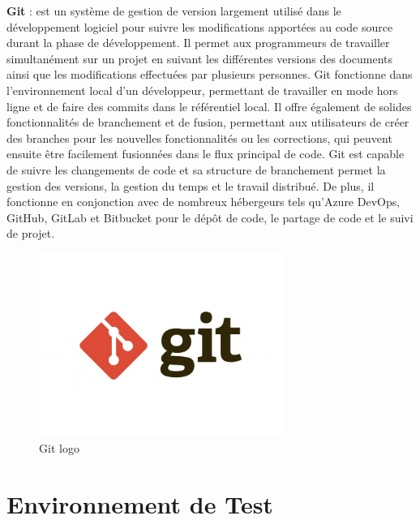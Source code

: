 \textbf{Git} : est un système de gestion de version largement utilisé dans le développement logiciel pour suivre les modifications apportées au code source durant la phase de développement. Il permet aux programmeurs de travailler simultanément sur un projet en suivant les différentes versions des documents ainsi que les modifications effectuées par plusieurs personnes. Git fonctionne dans l'environnement local d'un développeur, permettant de travailler en mode hors ligne et de faire des commits dans le référentiel local. Il offre également de solides fonctionnalités de branchement et de fusion, permettant aux utilisateurs de créer des branches pour les nouvelles fonctionnalités ou les corrections, qui peuvent ensuite être facilement fusionnées dans le flux principal de code. Git est capable de suivre les changements de code et sa structure de branchement permet la gestion des versions, la gestion du temps et le travail distribué. De plus, il fonctionne en conjonction avec de nombreux hébergeurs tels qu'Azure DevOps, GitHub, GitLab et Bitbucket pour le dépôt de code, le partage de code et le suivi de projet.
\\
\begin{figure}[H]
    \centering
    \includegraphics[width=8cm]{Figures/gitlogo.jpg}
    \caption{Git logo}
\end{figure}



\section{Environnement de Test}


